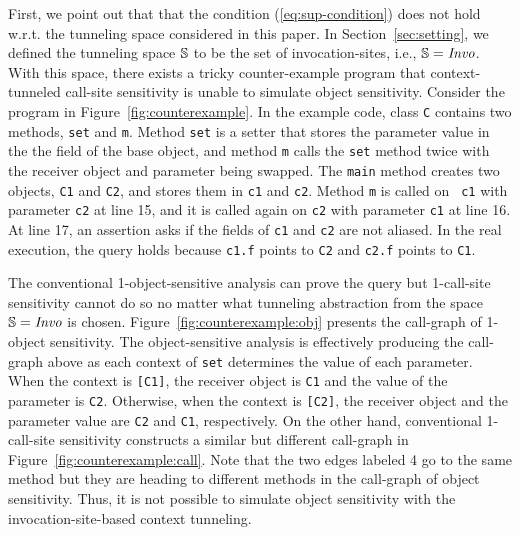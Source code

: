First, we point out that that the condition (\ref{eq:sup-condition}) does not hold w.r.t. the tunneling space considered in this paper. 
In Section~\ref{sec:setting}, we defined the tunneling space $\mathbb{S}$ to be the set of invocation-sites, i.e., $\mathbb{S} = \text{\it Invo}$. 
With this space, there exists a tricky counter-example program that context-tunneled
call-site sensitivity is unable to simulate object sensitivity.
Consider the program in Figure~\ref{fig:counterexample}. 
In the example code, class {\tt C} contains two methods, {\tt set} and {\tt m}.
Method {\tt set} is a setter that stores the parameter value in the
the field of the base object,
and method {\tt m} calls the {\tt set} method twice
with the receiver object and parameter being swapped.
The {\tt main} method creates two objects, {\tt C1} and {\tt C2}, and
stores them in {\tt c1} and {\tt c2}. Method {\tt m} is called on {\tt
  c1} with parameter {\tt c2} at line 15, and it is called again on
{\tt c2} with parameter {\tt c1} at line 16.
At line 17, an assertion asks if
the fields of {\tt c1} and {\tt c2} are not aliased.
In the real execution, the query holds because {\tt c1.f} points to {\tt C2} and
{\tt c2.f} points to {\tt C1}.

The conventional 1-object-sensitive analysis can prove the query but
1-call-site sensitivity cannot do so no matter what tunneling abstraction from the space $\mathbb{S} = \text{\it Invo}$ is
chosen.
Figure~\ref{fig:counterexample:obj} presents
the call-graph of 1-object sensitivity.
The object-sensitive analysis is effectively producing the call-graph above as
each context of {\tt set} determines the value of each parameter.
When the context is {\tt [C1]}, the receiver object is {\tt C1} and the value of the parameter is {\tt C2}.
Otherwise, when the context is {\tt [C2]}, the receiver object and the
parameter value are  {\tt C2} and {\tt C1}, respectively.
On the other hand, conventional 1-call-site sensitivity constructs a similar but
different call-graph in Figure~\ref{fig:counterexample:call}.
Note that the two edges labeled 4 go
to the same method but they are heading to different methods in the call-graph of object sensitivity. 
Thus, it is not possible to simulate object sensitivity with the invocation-site-based context tunneling. 




